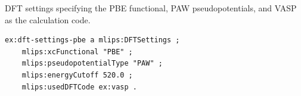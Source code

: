 DFT settings specifying the PBE functional, PAW pseudopotentials, and VASP as the calculation code.
\begin{lstlisting}[language=turtle]
ex:dft-settings-pbe a mlips:DFTSettings ;
    mlips:xcFunctional "PBE" ;
    mlips:pseudopotentialType "PAW" ;
    mlips:energyCutoff 520.0 ;
    mlips:usedDFTCode ex:vasp .
\end{lstlisting}
